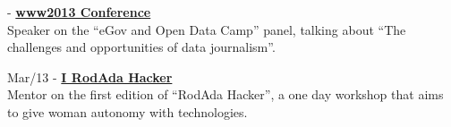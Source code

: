 \documentclass[]{friggeri-cv}
\begin{document}
{\footnotesize{}} - \href{http://www2013.org/}{\textbf{www2013 Conference}}\\
           {Speaker on the ``eGov and Open Data Camp'' panel, talking about ``The challenges and opportunities of data journalism''}.


{\footnotesize{Mar/13}} - \href{http://rodadahacker.com/}{\textbf{I RodAda Hacker}}\\
%
           {Mentor on the first edition of ``RodAda Hacker'', a one day workshop that aims to give woman autonomy with technologies}.



\end{document}
